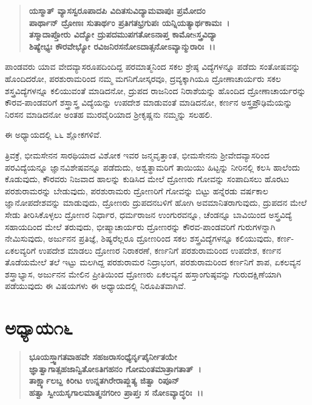 \begin{verse}
\textbf{ಯಸ್ಮಾತ್ ವ್ಯಾಸಸ್ವರೂಪಾದಪಿ ವಿದಿತಸುವಿದ್ಯಾಮವಾಪುಃ ಪ್ರಮೋದಂ}\\\textbf{ಪಾರ್ಥಾನ್ ದ್ರೋಣಃ ಸುತಾರ್ಥಂ ಪ್ರತಿಗತಭ್ರಗುಪಃ ಯನ್ನಿಯತ್ಯಾರ್ಥಕಾಮಃ~।}\\\textbf{ತಸ್ಮಾದಾಪ್ತೋರು ವಿದ್ಯೋ ದ್ರುಪದಮುಪಗತೋಽನಾಪ್ತ ಕಾಮೋsಸ್ತ್ರವಿದ್ಯಾ} \\\textbf{ಶಿಷ್ಯೇಭ್ಯಃ ಕೌರವೇಭ್ಯೋ ರವಿಜನಿರಸನೋಽದಾತ್ಸನೋಽವ್ಯಾನ್ಮುರಾರಿಃ~।।}
\end{verse}

ಪಾಂಡವರು ಯಾವ ವೇದವ್ಯಾಸರೂಪದಿಂದಿದ್ದ ಪರಮಾತ್ಮನಿಂದ ಸಕಲ ಶ್ರೇಷ್ಠ ವಿದ್ಯೆಗಳನ್ನೂ ಪಡೆದು ಸಂತೋಷವನ್ನು ಹೊಂದಿದರೋ, ಪರಶುರಾಮರಿಂದ ನಮ್ಮ ಮಗನಿಗೋಸ್ಕರವೂ, ದ್ರವ್ಯಕ್ಕಾಗಿಯೂ ದ್ರೋಣಾಚಾರ್ಯರು ಸಕಲ ಶಸ್ತ್ರವಿದ್ಯೆಗಳನ್ನೂ ಕಲಿಯುವಂತೆ ಮಾಡಿದನೋ, ದ್ರುಪದ ರಾಜನಿಂದ ನಿರಾಶೆಯನ್ನು ಹೊಂದಿದ ದ್ರೋಣಾಚಾರ್ಯರನ್ನು ಕೌರವ-ಪಾಂಡವರಿಗೆ ಶಸ್ತ್ರಾಸ್ತ್ರ ವಿದ್ಯೆಯನ್ನು ಉಪದೇಶ ಮಾಡುವಂತೆ ಮಾಡಿದನೋ, ಕರ್ಣನ ಅಸ್ತ್ರಪ್ರೌಢಿಮೆಯನ್ನು ನಿರಸನ ಮಾಡಿದನೋ ಅಂತಹ ಮುರವೈರಿಯಾದ ಶ‍್ರೀಕೃಷ್ಣನು ನಮ್ಮನ್ನು ಸಲಹಲಿ.

ಈ ಅಧ್ಯಾಯದಲ್ಲಿ ೬೬ ಶ್ಲೋಕಗಳಿವೆ.

ತ್ರಿವಕ್ರೆ, ಭೀಮಸೇನನ ಸಾರಥಿಯಾದ ವಿಶೋಕ ಇವರ ಜನ್ಮವೃತ್ತಾಂತ, ಭೀಮಸೇನನು ಶ‍್ರೀವೇದವ್ಯಾಸರಿಂದ ಪರವಿದ್ಯೆಯನ್ನೂ ಜ್ಞಾನವಿಶೇಷವನ್ನೂ ಪಡೆದುದು, ಅಶ್ವತ್ಥಾಮರಿಗೆ ತಾಯಿಯು ಹಿಟ್ಟನ್ನು ನೀರಿನಲ್ಲಿ ಕಲಸಿ ಹಾಲೆಂದು ಕೊಡುವುದು, ಕೌರವರು ನಿಜವಾದ ಹಾಲನ್ನು ಕುಡಿಸಿದ ಮೇಲೆ ದ್ರೋಣರು ಗೋವನ್ನು ಸಂಪಾದಿಸಲು ಹೊರಟು ಪರಶುರಾಮರನ್ನು ಬೇಡುವುದು, ಪರಶುರಾಮರು ದ್ರೋಣರಿಗೆ ಗೋವನ್ನು ಬಿಟ್ಟು ಹನ್ನೆರಡು ವರ್ಷಕಾಲ ಜ್ಞಾನೋಪದೇಶವನ್ನು ಮಾಡುವುದು, ದ್ರೋಣರು ದ್ರುಪದನಬಳಿಗೆ ಹೋಗಿ ಅವಮಾನಿತರಾಗುವುದು, ದ್ರುಪದನ ಮೇಲೆ ಸೇಡು ತೀರಿಸಿಕೊಳ್ಳಲು ದ್ರೋಣರ ನಿರ್ಧಾರ, ಧರ್ಮರಾಜನ ಉಂಗುರವನ್ನೂ, ಚೆಂಡನ್ನೂ ಬಾವಿಯಿಂದ ಅಸ್ತ್ರವಿದ್ಯೆ ಸಹಾಯದಿಂದ ಮೇಲೆ ತರುವುದು, ಭೀಷ್ಮಾಚಾರ್ಯರು ದ್ರೋಣರನ್ನು ಕೌರವ-ಪಾಂಡವರಿಗೆ ಗುರುಗಳನ್ನಾಗಿ ನೇಮಿಸುವುದು, ಅರ್ಜುನನ ಪ್ರತಿಜ್ಞೆ, ಶಿಷ್ಯರೆಲ್ಲರೂ ದ್ರೋಣರಿಂದ ಸಕಲ ಶಸ್ತ್ರವಿದ್ಯೆಗಳನ್ನೂ ಕಲಿಯುವುದು, ಕರ್ಣ-ಏಕಲವ್ಯರಿಗೆ ಉಪದೇಶ ಮಾಡಲು ದ್ರೋಣರ ನಿರಾಕರಣೆ, ಕರ್ಣನಿಗೆ ಪರಶುರಾಮರಿಂದ ಉಪದೇಶ, ಕರ್ಣನ ತೊಡೆಯಮೇಲೆ ತಲೆ ಇಟ್ಟು ಮಲಗಿದ್ದ ಪರಶುರಾಮರ ನಿದ್ರಾಭಂಗ, ಪರಶುರಾಮರಿಂದ ಕರ್ಣನಿಗೆ ಶಾಪ, ಏಕಲವ್ಯನ ಶಸ್ತ್ರಾಭ್ಯಾಸ, ಅರ್ಜುನನ ಮೇಲಿನ ಪ್ರೀತಿಯಿಂದ ದ್ರೋಣರು ಏಕಲವ್ಯನ ಹಸ್ತಾಂಗುಷ್ಠವನ್ನು ಗುರುದಕ್ಷಿಣೆಯಾಗಿ ಪಡೆಯುವುದು ಈ ವಿಷಯಗಳು ಈ ಅಧ್ಯಾಯದಲ್ಲಿ ನಿರೂಪಿತವಾಗಿವೆ.


\section*{ಅಧ್ಯಾಯ\enginline{-}೧೬}

\begin{verse}
\textbf{ಭೂಯಸ್ತ್ವಾಗತವಾಹವೇ ಸಹಜರಾಸಂಧ್ಯೆರ್ನೃಪೈರ್ನೀತಯೇ }\\\textbf{ಜ್ಞಾತ್ವಾಗಾತ್ಸಹಜಾನ್ವಿತೋಽತಿಗಹನಂ ಗೋಮಂತಮಾತ್ರಾಗತಾತ್~।}\\\textbf{ತಾರ್ಕ್ಷ್ಯಾಲಬ್ದ ಕಿರೀಟ ಉನ್ನತಗಿರೇರಾಪ್ಲುತ್ಯ ಜಿತ್ವಾ ರಿಪೂನ್}\\\textbf{ಹತ್ವಾ ಸ್ವೀಯಸೃಗಾಲಮಾತ್ಮನಗರೀಂ ಪ್ರಾಪ್ತಃ ಸ ನೋಽವ್ಯಾದ್ಧರಿಃ~।।}
\end{verse}

